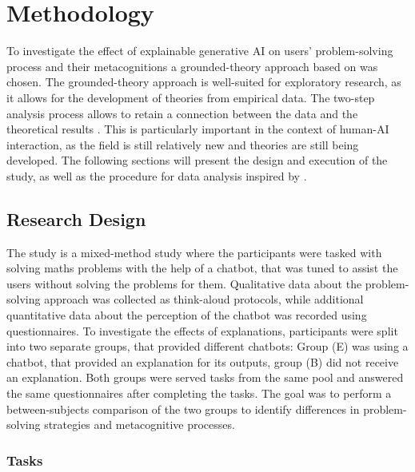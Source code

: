 \section{Methodology} \label{sec:methodology}

To investigate the effect of explainable generative \ac{AI} on users' problem-solving process and their metacognitions a grounded-theory approach based on \textcite{Gioia2013} was chosen. The grounded-theory approach is well-suited for exploratory research, as it allows for the development of theories from empirical data. The two-step analysis process allows to retain a connection between the data and the theoretical results \parencite{Gioia2021}. This is particularly important in the context of human-\ac{AI} interaction, as the field is still relatively new and theories are still being developed. The following sections will present the design and execution of the study, as well as the procedure for data analysis inspired by \textcite{Jussupow2021}.

\subsection{Research Design} \label{ssec:research_design}

The study is a mixed-method study where the participants were tasked with solving maths problems with the help of a chatbot, that was tuned to assist the users without solving the problems for them. Qualitative data about the problem-solving approach was collected as think-aloud protocols, while additional quantitative data about the perception of the chatbot was recorded using questionnaires. To investigate the effects of explanations, participants were split into two separate groups, that provided different chatbots: Group (E) was using a chatbot, that provided an explanation for its outputs, group (B) did not receive an explanation. Both groups were served tasks from the same pool and answered the same questionnaires after completing the tasks. The goal was to perform a between-subjects comparison of the two groups to identify differences in problem-solving strategies and metacognitive processes.

\subsubsection{Tasks} \label{sssec:tasks}

